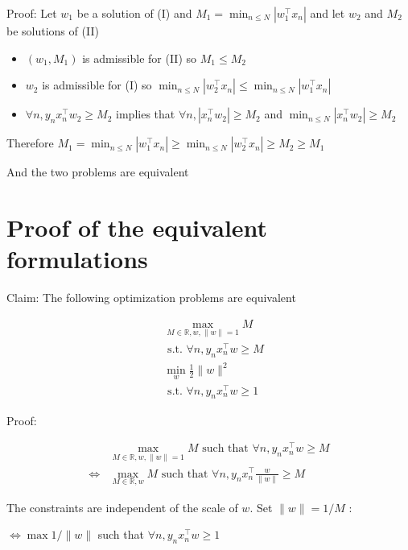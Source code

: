 \documentclass[10pt]{article}
\begin{document}
Proof: Let $w_{1}$ be a solution of (I) and $M_{1}=\min _{n \leq N}\left|w_{1}^{\top} x_{n}\right|$ and let $w_{2}$ and $M_{2}$ be solutions of (II)

\begin{itemize}
  \item $\left(w_{1}, M_{1}\right)$ is admissible for (II) so $M_{1} \leq M_{2}$
  \item $w_{2}$ is admissible for (I) so $\min _{n \leq N}\left|w_{2}^{\top} x_{n}\right| \leq \min _{n \leq N}\left|w_{1}^{\top} x_{n}\right|$
  \item $\forall n, y_{n} x_{n}^{\top} w_{2} \geq M_{2}$ implies that $\forall n,\left|x_{n}^{\top} w_{2}\right| \geq M_{2}$ and $\min _{n \leq N}\left|x_{n}^{\top} w_{2}\right| \geq M_{2}$
\end{itemize}

Therefore $M_{1}=\min _{n \leq N}\left|w_{1}^{\top} x_{n}\right| \geq \min _{n \leq N}\left|w_{2}^{\top} x_{n}\right| \geq M_{2} \geq M_{1}$

And the two problems are equivalent

\section*{Proof of the equivalent formulations}
Claim: The following optimization problems are equivalent

$$
\begin{aligned}
& \max _{M \in \mathbb{R}, w,\|w\|=1} M \\
& \text { s.t. } \forall n, y_{n} x_{n}^{\top} w \geq M \\
& \min _{w} \frac{1}{2}\|w\|^{2} \\
& \text { s.t. } \forall n, y_{n} x_{n}^{\top} w \geq 1
\end{aligned}
$$

Proof:

$$
\begin{aligned}
& \max _{M \in \mathbb{R}, w,\|w\|=1} M \text { such that } \forall n, y_{n} x_{n}^{\top} w \geq M \\
\Longleftrightarrow & \max _{M \in \mathbb{R}, w} M \text { such that } \forall n, y_{n} x_{n}^{\top} \frac{w}{\|w\|} \geq M
\end{aligned}
$$

The constraints are independent of the scale of $w$. Set $\|w\|=1 / M$ :

$\Longleftrightarrow \max 1 /\|w\|$ such that $\forall n, y_{n} x_{n}^{\top} w \geq 1$
\end{document}
